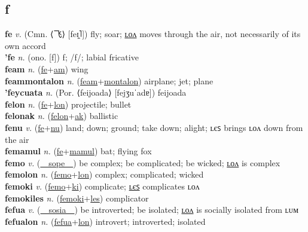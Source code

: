 \subsection{f}

\textbf{fe} \textit{v.} (Cmn. ⟨飞⟩ [feɪ̯˥])
fly; soar; \hyperref[felon]{ʟᴏᴧ} moves through the air, not necessarily of its own accord \label{fe} \\
\textbf{'fe} \textit{n.} (ono. [f])
f; /f/; labial fricative \label{'fe} \\
\textbf{feam} \textit{n.} (\hyperref[fe]{fe}+\hyperref[am]{am})
wing \label{feam} \\
\textbf{feammontalon} \textit{n.} (\hyperref[feam]{feam}+\hyperref[montalon]{montalon})
airplane; jet; plane \label{feammontalon} \\
\textbf{'feycuata} \textit{n.} (Por. ⟨feijoada⟩ [fejʒuˈadɐ])
feijoada \label{'feycuata} \\
\textbf{felon} \textit{n.} (\hyperref[fe]{fe}+\hyperref[lon]{lon})
projectile; bullet \label{felon} \\
\textbf{felonak} \textit{n.} (\hyperref[felon]{felon}+\hyperref[ak]{ak})
ballistic \label{felonak} \\
\textbf{fenu} \textit{v.} (\hyperref[fe]{fe}+\hyperref[nu]{nu})
land; down; ground; take down; alight; ʟєꜱ brings ʟᴏᴧ down from the air \label{fenu} \\
\textbf{femamul} \textit{n.} (\hyperref[fe]{fe}+\hyperref[mamul]{mamul})
bat; flying fox \label{femamul} \\
\textbf{femo} \textit{v.} (\hyperref[sope]{~~sope~~})
be complex; be complicated; be wicked; \hyperref[femolon]{ʟᴏᴧ} is complex \label{femo} \\
\textbf{femolon} \textit{n.} (\hyperref[femo]{femo}+\hyperref[lon]{lon})
complex; complicated; wicked \label{femolon} \\
\textbf{femoki} \textit{v.} (\hyperref[femo]{femo}+\hyperref[ki]{ki})
complicate; \hyperref[femokiles]{ʟєꜱ} complicates ʟᴏᴧ \label{femoki} \\
\textbf{femokiles} \textit{n.} (\hyperref[femoki]{femoki}+\hyperref[les]{les})
complicator \label{femokiles} \\
\textbf{fefua} \textit{v.} (\hyperref[sosia]{~~sosia~~})
be introverted; be isolated; \hyperref[fefualon]{ʟᴏᴧ} is socially isolated from ʟᴜᴍ \label{fefua} \\
\textbf{fefualon} \textit{n.} (\hyperref[fefua]{fefua}+\hyperref[lon]{lon})
introvert; introverted; isolated \label{fefualon} \\
